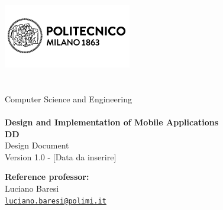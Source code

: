\makeatletter
\begin{titlepage}
	\begin{center} 
		\includegraphics{document/resources/images/logo_polimi.png}\\[4ex]
		{\Huge \bfseries \sffamily \@title }\\[4ex] 
		{\Large  \@author}\\[2ex] 
		Computer Science and Engineering\\[5ex]
		\@date\\[5ex]
		\begingroup
            \fontsize{15pt}{12pt}\selectfont
            \textbf{Design and Implementation of Mobile Applications}
        \endgroup\\[3ex]
        \begingroup
            \fontsize{20pt}{12pt}\selectfont
            \textbf{DD}\\[1ex]
            \fontsize{15pt}{12pt}\selectfont
            Design Document
        \endgroup\\[8ex]
	    Version 1.0 - [Data da inserire]
	\end{center}
	
	\vspace*{\fill}
	\begin{flushright}
	    \textbf{Reference professor:}\\[0.2cm]
	    Luciano Baresi\\[0cm]
        {\small \href{mailto:luciano.baresi@polimi.it}{\texttt{luciano.baresi@polimi.it}}}
	\end{flushright}
\end{titlepage}
\makeatother
\thispagestyle{empty}
\setcounter{page}{1} %